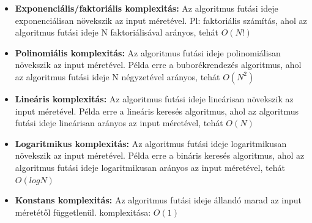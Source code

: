 \documentclass[11pt,a4paper]{article}
\begin{document}
            \begin{tcolorbox}[colback=blue!5!white,colframe=blue!50!black,title= 5. Ismertesse az algoritmusok komplexitásának meghatározását! Mondjon példát gyakori komplexitás típusokra!]
                \begin{itemize}
                    \item \textbf{Exponenciális/faktoriális komplexitás:} Az algoritmus futási ideje exponenciálisan növekszik az input méretével. Pl: faktoriális számítás, ahol az algoritmus futási ideje N faktoriálisával arányos, tehát \(O(N!)\)
                    \item \textbf{Polinomiális komplexitás:} Az algoritmus futási ideje polinomiálisan növekszik az input méretével. Példa erre a buborékrendezés algoritmus, ahol az algoritmus futási ideje N négyzetével arányos, tehát \(O(N^2)\)
                    \item \textbf{Lineáris komplexitás:} Az algoritmus futási ideje lineárisan növekszik az input méretével. Példa erre a lineáris keresés algoritmus, ahol az algoritmus futási ideje lineárisan arányos az input méretével, tehát \(O(N)\)
                    \item \textbf{Logaritmikus komplexitás:} Az algoritmus futási ideje logaritmikusan növekszik az input méretével. Példa erre a bináris keresés algoritmus, ahol az algoritmus futási ideje logaritmikusan arányos az input méretével, tehát \(O(log N)\)
                    \item \textbf{Konstans komplexitás:} Az algoritmus futási ideje állandó marad az input méretétől függetlenül. komplexitása: \(O(1)\)
                \end{itemize}
                \begin{center}
                \end{center}
            \end{tcolorbox}
\end{document}
